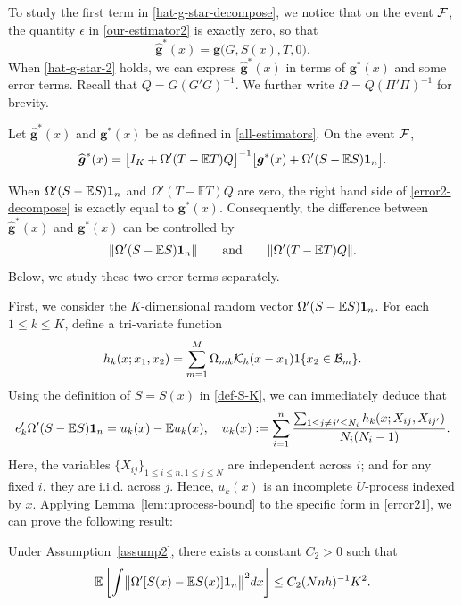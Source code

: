 \documentclass[preprint,11pt]{article}
\newcommand{\mbb}{\mathbb}
\newcommand{\bg}{{\boldsymbol g}}
\numberwithin{equation}{section}
\newcommand{\beq}{\begin{equation}}
\newcommand{\eeq}{\end{equation}}
\begin{document}
To study the first term in \eqref{hat-g-star-decompose}, we notice that on the event 
${\cal F}$, the quantity $\epsilon$ in \eqref{our-estimator2} is exactly zero, so that  
\beq \label{hat-g-star-2}
\widehat{\boldsymbol g}^{*}(x) = {\boldsymbol g}\bigl(G, S(x), T, 0 \bigr). 
\eeq
When \eqref{hat-g-star-2} holds, we can express $\widehat{\bg}^*(x)$ in terms of $\bg^*(x)$ and some error terms. Recall that $Q=G(G'G)^{-1}$. We further write $\Omega=Q(\Pi'\Pi)^{-1}$ for brevity. 
\begin{lemma} \label{lem:error2-decompose}
Let $\widehat{\bg}^*(x)$ and $\bg^*(x)$ be as defined in \eqref{all-estimators}. On the event ${\cal F}$, %
\beq \label{error2-decompose}
\widehat{\boldsymbol g}^*(x) = \bigl[I_K +\Omega'(T-\mathbb{E}T)Q\bigr]^{-1}\bigl[\bg^*(x) + \Omega'(S-\mathbb{E}S){\bf 1}_n\bigr]. 
\eeq 
\end{lemma}
When $\Omega'(S-\mathbb{E}S){\bf 1}_n$ and $\Omega'(T-\mathbb{E}T)Q$ are zero, the right hand side of \eqref{error2-decompose} is exactly equal to $\bg^*(x)$. 
Consequently, the difference between $\widehat{\bg}^*(x)$ and $\bg^*(x)$ can be controlled by
\[
\|\Omega'(S-\mathbb{E}S){\bf 1}_n\|\qquad \mbox{and}\qquad  \|\Omega'(T-\mathbb{E}T)Q\|.
\]
Below, we study these two error terms separately.  

First, we consider the $K$-dimensional random vector $\Omega'(S -\mathbb{E}S){\bf 1}_n$. %
For each $1\leq k\leq K$, define a tri-variate function 
\[
h_k(x; x_1, x_2)=\sum_{m=1}^M\Omega_{mk}{\cal K}_h(x-x_1)1\{x_2\in {\cal B}_m\}.
\]
Using the definition of $S=S(x)$ in \eqref{def-S-K}, we can immediately deduce that 
\beq \label{error21}
e_k'\Omega'(S -\mathbb{E}S){\bf 1}_n =u_k(x)-\mathbb{E}u_k(x), \quad u_k(x):= \sum_{i=1}^n\frac{\sum_{1\leq j\neq j'\leq N_i}h_k(x; X_{ij}, X_{ij'})}{N_i(N_i-1)}.  
\eeq
Here, the variables $\{X_{ij}\}_{1\le i\le n,1\le j\le N}$ are independent across $i$; and for any fixed $i$, they are i.i.d. across $j$. Hence, $u_k(x)$ is an incomplete $U$-process indexed by $x$. 
Applying Lemma~\ref{lem:uprocess-bound} to the specific form in \eqref{error21}, we can prove the following result:
\begin{lemma} \label{lem:error21}
Under Assumption~\ref{assump2}, 
there exists a constant $C_2>0$ such that 
\[
\mbb{E}\left[\int \bigl\|\Omega'[S(x)-\mathbb{E}S(x)]{\bf 1}_n\bigr\|^2dx\right] \le C_2 (Nnh)^{-1}K^2. 
\]
\end{lemma}
\end{document}
